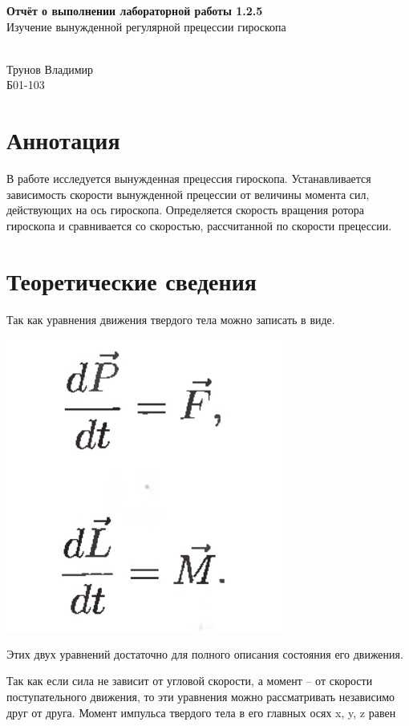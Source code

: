 \documentclass[a4paper,12pt]{article} %
\date{\today}
\begin{document}
\begin{titlepage}

	\vspace*{10cm}
	{\huge
		\begin{center}
			{\bf
            Отчёт о выполнении лабораторной работы 1.2.5}\\
			Изучение вынужденной регулярной прецессии гироскопа
		\end{center}
	}
	\vspace{8cm}
	\begin{flushright}
		{\LARGE\\ Трунов Владимир \\
			\vspace{0.2cm}
			Б01-103}
	\end{flushright}
	\vspace{8cm}
\end{titlepage}


\section{Аннотация}

В работе исследуется вынужденная прецессия гироскопа. Устанавливается зависимость скорости вынужденной прецессии от величины момента сил, действующих на ось гироскопа. Определяется скорость вращения ротора гироскопа и сравнивается со скоростью, рассчитанной по скорости прецессии. 


\section{Теоретические сведения}

Так как уравнения движения твердого тела можно записать в виде. 

\begin{center}

  \includegraphics[width=0.2\linewidth]{IMG_1.jpg}\\
 
 \end{center}


Этих двух уравнений достаточно для полного описания состояния его движения. 

Так как если сила не зависит от угловой скорости, а момент -- от скорости поступательного движения, то эти уравнения можно рассматривать независимо друг от друга. 
Момент импульса твердого тела в его главных осях x, y, z равен
\end{document}

